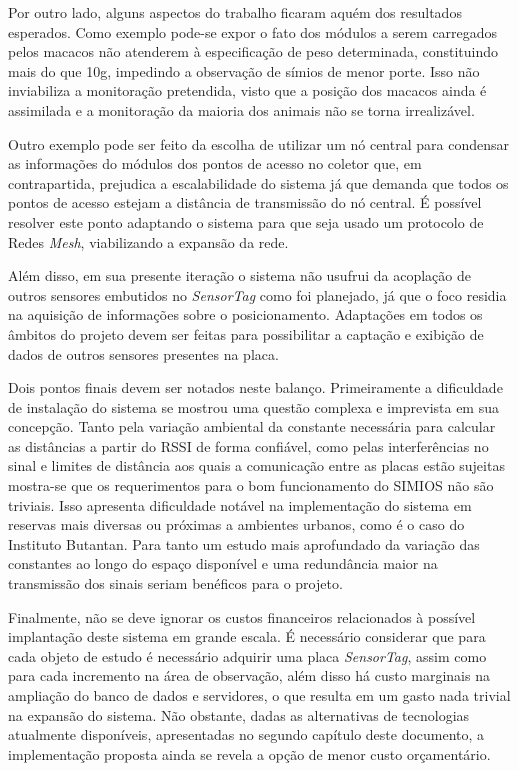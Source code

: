 Por outro lado, alguns aspectos do trabalho ficaram aquém dos resultados esperados. Como exemplo pode-se expor o fato dos módulos a serem carregados pelos macacos não atenderem à especificação de peso determinada, constituindo mais do que 10g, impedindo a observação de símios de menor porte. Isso não inviabiliza a monitoração pretendida, visto que a posição dos macacos ainda é assimilada e a monitoração da maioria dos animais não se torna irrealizável.

Outro exemplo pode ser feito da escolha de utilizar um nó central para condensar as informações do módulos dos pontos de acesso no coletor que, em contrapartida, prejudica a escalabilidade do sistema já que demanda que todos os pontos de acesso estejam a distância de transmissão do nó central. É possível resolver este ponto adaptando o sistema para que seja usado um protocolo de Redes \emph{Mesh}, viabilizando a expansão da rede.

Além disso, em sua presente iteração o sistema não usufrui da acoplação de outros sensores embutidos no \emph{SensorTag} como foi planejado, já que o foco residia na aquisição de informações sobre o posicionamento. Adaptações em todos os âmbitos do projeto devem ser feitas para possibilitar a captação e exibição de dados de outros sensores presentes na placa.

Dois pontos finais devem ser notados neste balanço. Primeiramente a dificuldade de instalação do sistema se mostrou uma questão complexa e imprevista em sua concepção. Tanto pela variação ambiental da constante necessária para calcular as distâncias a partir do RSSI de forma confiável, como pelas interferências no sinal e limites de distância aos quais a comunicação entre as placas estão sujeitas mostra-se que os requerimentos para o bom funcionamento do SIMIOS não são triviais. Isso apresenta dificuldade notável na implementação do sistema em reservas mais diversas ou próximas a ambientes urbanos, como é o caso do Instituto Butantan. Para tanto um estudo mais aprofundado da variação das constantes ao longo do espaço disponível e uma redundância maior na transmissão dos sinais seriam benéficos para o projeto.

Finalmente, não se deve ignorar os custos financeiros relacionados à possível implantação deste sistema em grande escala. É necessário considerar que para cada objeto de estudo é necessário adquirir uma placa \emph{SensorTag}, assim como para cada incremento na área de observação, além disso há custo marginais na ampliação do banco de dados e servidores, o que resulta em um gasto nada trivial na expansão do sistema. Não obstante, dadas as alternativas de tecnologias atualmente disponíveis, apresentadas no segundo capítulo deste documento, a implementação proposta ainda se revela a opção de menor custo orçamentário.

